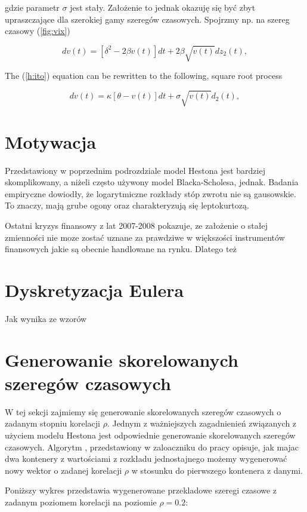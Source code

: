 \documentclass{pracamgr}
\begin{document}
gdzie parametr $\sigma$ jest stały. Założenie to jednak okazuję się być zbyt upraszczające dla szerokiej gamy szeregów czasowych. Spojrzmy np. na szereg czasowy  (\ref{fig:vix}) 



\begin{equation}\label{h:ito}
dv(t) = [\delta^2 - 2 \beta v(t)] dt + 2\beta \sqrt{v(t)} dz_2(t),
\end{equation}

The (\ref{h:ito}) equation can be rewritten to the following, square root process

\begin{equation}\label{h:squareroot}
dv(t) = \kappa [\theta - v(t)] dt + \sigma \sqrt{v(t)} d_2 (t),
\end{equation}


\section{Motywacja}
Przedstawiony w poprzednim podrozdziale model Hestona jest bardziej skomplikowany, a niżeli często używony model Blacka-Scholesa, jednak.
Badania empiryczne dowiodły, że logarytmiczne rozkłady stóp zwrotu nie są gausowskie. To znaczy, mają grube ogony oraz charakteryzują się leptokurtozą.

Ostatni kryzys finansowy z lat 2007-2008 pokazuje, ze założenie o stałej zmienności nie moze zostać uznane za prawdziwe w większości instrumentów finansowych jakie są obecnie handlowane na rynku. Dlatego też 


\section{Dyskretyzacja Eulera}
 Jak wynika ze wzorów  

  
\section{Generowanie skorelowanych szeregów czasowych}
W tej sekcji zajmiemy się generowanie skorelowanych szeregów czasowych o zadanym stopniu korelacji $\rho$.
Jednym z ważniejszych zagadnienień związanych z użyciem modelu Hestona jest odpowiednie generowanie skorelowanych szeregów czasowych. Algorytm , przedstawiony w zaloaczniku do pracy opisuje, jak majac dwa kontenery z wartościami z rozkładu jednostajnego możemy wygenerować nowy wektor o zadanej korelacji $\rho$ w stosunku do pierwszego kontenera z danymi. 

Poniższy wykres przedstawia wygenerowane przekladowe szeregi czasowe z zadanym poziomem korelacji na poziomie $\rho = 0.2$:
\end{document}
